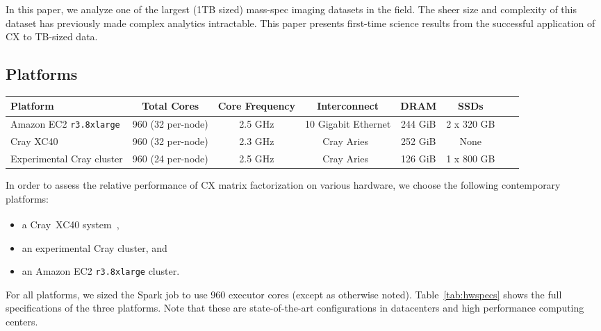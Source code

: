 In this paper, we analyze one of the largest (1TB sized) mass-spec imaging datasets in the field. The sheer size and complexity of this dataset
has previously made complex analytics intractable. This paper presents first-time science results from the successful application of CX to TB-sized data.

\subsection{Platforms}

  \begin{table*}
    \begin{center}
    \begin{tabular}{| l | c | c | c | c | c | c | c |}
    \toprule
    \textbf{Platform} & \textbf{Total Cores} & \textbf{Core Frequency} & \textbf{Interconnect} & \textbf{DRAM} & \textbf{SSDs} \\
    \midrule
    Amazon EC2 \texttt{r3.8xlarge} & 960 (32 per-node) & 2.5 GHz & 10 Gigabit Ethernet & 244 GiB & 2 x 320 GB \\
    \midrule
    Cray XC40 & 960 (32 per-node) & 2.3 GHz & Cray Aries~\cite{alverson2012cray,craycascadesc12} & 252 GiB & None \\
    \midrule
    Experimental Cray cluster & 960 (24 per-node) & 2.5 GHz & Cray Aries~\cite{alverson2012cray,craycascadesc12} & 126 GiB & 1 x 800 GB \\
    \bottomrule
    \end{tabular}
    \end{center}
    \caption{Specifications of the three hardware platforms used in these performance experiments.}
    \label{tab:hwspecs}
  \end{table*}

 In order to assess the relative performance of CX matrix factorization on various hardware, we choose the following contemporary platforms:
 \begin{itemize}
 \item a Cray\textregistered~XC40\textsuperscript{\tiny\texttrademark}
 system~\cite{alverson2012cray,craycascadesc12},
 \item an experimental Cray cluster, and
 \item an Amazon EC2 \texttt{r3.8xlarge} cluster.
 \end{itemize}

 For all platforms, we sized the Spark job to use 960 executor cores (except as
 otherwise noted).  Table~\ref{tab:hwspecs} shows the full specifications of
 the three platforms. Note that these are state-of-the-art configurations in
 datacenters and high performance computing centers. 

